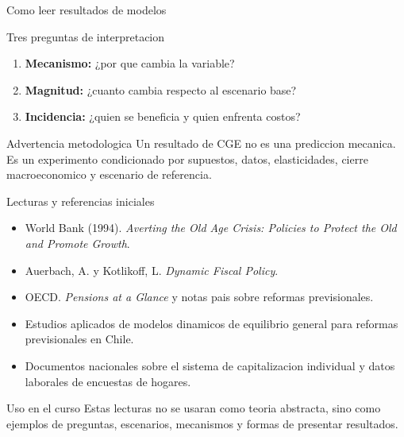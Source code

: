 \documentclass[10pt,aspectratio=169]{beamer}
\begin{document}
\begin{frame}{Como leer resultados de modelos}
\begin{block}{Tres preguntas de interpretacion}
\begin{enumerate}
  \item \textbf{Mecanismo:} ¿por que cambia la variable?
  \item \textbf{Magnitud:} ¿cuanto cambia respecto al escenario base?
  \item \textbf{Incidencia:} ¿quien se beneficia y quien enfrenta costos?
\end{enumerate}
\end{block}

\vspace{0.25cm}
\begin{alertblock}{Advertencia metodologica}
Un resultado de CGE no es una prediccion mecanica. Es un experimento condicionado por supuestos, datos, elasticidades, cierre macroeconomico y escenario de referencia.
\end{alertblock}
\end{frame}

\begin{frame}{Lecturas y referencias iniciales}
\small
\begin{itemize}
  \item World Bank (1994). \textit{Averting the Old Age Crisis: Policies to Protect the Old and Promote Growth}.
  \item Auerbach, A. y Kotlikoff, L. \textit{Dynamic Fiscal Policy}.
  \item OECD. \textit{Pensions at a Glance} y notas pais sobre reformas previsionales.
  \item Estudios aplicados de modelos dinamicos de equilibrio general para reformas previsionales en Chile.
  \item Documentos nacionales sobre el sistema de capitalizacion individual y datos laborales de encuestas de hogares.
\end{itemize}

\vspace{0.3cm}
\begin{block}{Uso en el curso}
Estas lecturas no se usaran como teoria abstracta, sino como ejemplos de preguntas, escenarios, mecanismos y formas de presentar resultados.
\end{block}
\end{frame}
\end{document}
